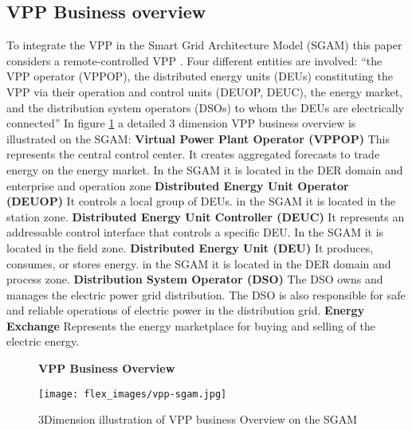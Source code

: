 \documentclass[nonacm,sigconf,12pt]{acmart}
\begin{document}
\subsection*{VPP Business overview}  
To integrate the VPP in the Smart Grid Architecture Model (SGAM) this paper considers a remote-controlled VPP \cite{integratingthesmartgridsaustria_2017_technical}. Four different entities are involved: “the VPP operator  (VPPOP), the distributed energy units (DEUs) constituting the VPP via their operation and control units (DEUOP, DEUC), the energy market, and the distribution system operators (DSOs) to whom the DEUs are electrically connected” \cite{integratingthesmartgridsaustria_2017_technical} In figure \ref{fig:vppOverview} a detailed 3 dimension VPP business overview is illustrated on the SGAM:  \newline
\textbf{Virtual Power Plant Operator (VPPOP)} \newline
This represents the central control center. It creates aggregated forecasts to trade energy on the energy market. In the SGAM it is located in the DER domain and enterprise and operation zone \cite{integratingthesmartgridsaustria_2017_technical} \newline
\textbf{Distributed Energy Unit Operator (DEUOP)} \newline
It controls a local group of DEUs. in the SGAM it is located in the station zone.\newline
\textbf{Distributed Energy Unit Controller (DEUC)} \newline
It represents an addressable control interface that controls a specific DEU. In the SGAM it is located in the field zone.\newline
\textbf{Distributed Energy Unit (DEU)} \newline
It produces, consumes, or stores energy. in the SGAM it is located in the DER domain and process zone. \newline
\textbf{Distribution System Operator (DSO)} \newline
The DSO owns and manages the electric power grid distribution. The DSO is also responsible for safe and reliable operations of electric power in the distribution grid. \newline
\textbf{Energy Exchange} \newline
Represents the energy marketplace for buying and selling of the electric energy.
\begin{figure}
 \textbf{VPP Business Overview}\par\medskip
 \texttt{[image: flex\_images/vpp-sgam.jpg]}
 \caption{3Dimension illustration of VPP business Overview on the SGAM}
 \label{fig:vppOverview}
\end{figure}
\end{document}
